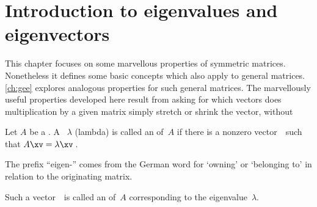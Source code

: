 

\section{Introduction to eigenvalues and eigenvectors}
\label{sec:iee}
\secttoc
{}

\begin{comment}
\pooliv{\S4.1} \layiv{\S5.1} \holti{\S6.1}  \cite[Ch.~8, 11]{Chartier2015}
\end{comment}


This chapter focuses on some marvellous properties of symmetric matrices.  
Nonetheless it defines some basic concepts which also apply to general matrices.  
\cref{ch:gee} explores analogous properties for such general matrices.
The marvellously useful properties developed here result from asking for which vectors does multiplication by a given matrix simply stretch or shrink the vector, without 


\begin{definition} \label{def:evecval}
Let \(A\) be a .  
A ~\(\lambda\) (lambda) is called an  of~\(A\) if 
there is a nonzero vector~\xv\ such that \(A\xv=\lambda\xv\)\,. 
\begin{aside}
The prefix ``eigen-'' comes from the German word for `owning' or `belonging to' in relation to the originating matrix.
\end{aside}
Such a vector~\xv\ is called an  of~\(A\) corresponding to the eigenvalue~\(\lambda\).   
\end{definition}


